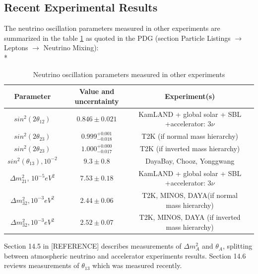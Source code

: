 \subsection{Recent Experimental Results}
The neutrino oscillation parameters measured in other experiments are summarized in the table \ref{tab:MeasuredPars} as quoted in the PDG \cite{ref_PDG} (section Particle Listings $\rightarrow$ Leptons $\rightarrow$ Neutrino Mixing):\\*
\begin{table}[h]
  \begin{center}
  \caption{ Neutrino oscillation parameters measured in other experiments}
  \begin{tabular}{|c|c|c|c|}
     Parameter & Value and uncerntainty & Experiment(s) \\ \hline
     $sin^2(2\theta_{12})$ &  $0.846\pm0.021$  &  KamLAND + global solar + SBL +accelerator: 3$\nu$  \\ \hline 
     $sin^2(2\theta_{23})$ &  $0.999^{+0.001}_{-0.018}$  &  T2K (if normal mass hierarchy)   \\ \hline 
     $sin^2(2\theta_{23})$ &  $1.000^{+0.000}_{-0.017}$  &  T2K (if inverted mass hierarchy)   \\ \hline 
     $sin^2(\theta_{13}), 10^{-2}$ &  $9.3\pm0.8$  &  DayaBay, Chooz, Yonggwang    \\ \hline 
     ${\Delta}m^2_{21}$, $10^{-5} eV^2$ &  $7.53\pm0.18$  &  KamLAND + global solar + SBL +accelerator: 3$\nu$   \\ \hline 
     ${\Delta}m^2_{32}, 10^{-3} eV^2$ &  $2.44\pm0.06$  &  T2K, MINOS, DAYA(if normal mass hierarchy)     \\ \hline
     ${\Delta}m^2_{32}, 10^{-3} eV^2$ &  $2.52\pm0.07$  &  T2K, MINOS, DAYA (if inverted mass hierarchy)     \\ \hline 
  \end{tabular}
  \label{tab:MeasuredPars}
  \end{center}
\end{table}

Section 14.5 in [REFERENCE] describes measurements of $\Delta{m^2_A}$ and $\theta_A$, splitting between atmospheric neutrino and accelerator experiments results. Section 14.6 reviews measurements of $\theta_{13}$ which was measured recently.

